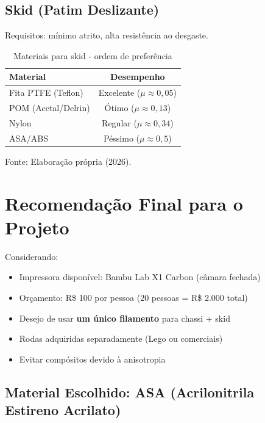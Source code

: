 \documentclass[12pt, a4paper]{article}
\newcommand{\fonte}[1]{\vspace{0.2cm}\par\noindent\fontsize{9}{11}\selectfont Fonte: #1}
\begin{document}
\subsection{Skid (Patim Deslizante)}

Requisitos: mínimo atrito, alta resistência ao desgaste.

\begin{table}[h]
\centering
\caption{Materiais para skid - ordem de preferência}
\label{tab:skid}
\begin{tabular}{l|c}
\hline
\textbf{Material} & \textbf{Desempenho} \\ \hline
Fita PTFE (Teflon) & Excelente ($\mu \approx 0,05$) \\
POM (Acetal/Delrin) & Ótimo ($\mu \approx 0,13$) \\
Nylon & Regular ($\mu \approx 0,34$) \\
ASA/ABS & Péssimo ($\mu \approx 0,5$) \\ \hline
\end{tabular}
\fonte{Elaboração própria (2026).}
\end{table}

\section{Recomendação Final para o Projeto}

Considerando:
\begin{itemize}
    \item Impressora disponível: Bambu Lab X1 Carbon (câmara fechada)
    \item Orçamento: R\$ 100 por pessoa (20 pessoas = R\$ 2.000 total)
    \item Desejo de usar \textbf{um único filamento} para chassi + skid
    \item Rodas adquiridas separadamente (Lego ou comerciais)
    \item Evitar compósitos devido à anisotropia
\end{itemize}

\subsection*{Material Escolhido: ASA (Acrilonitrila Estireno Acrilato)}
\end{document}
